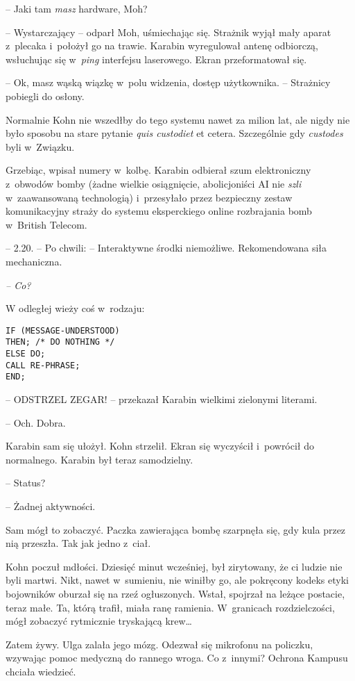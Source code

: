 \documentclass[oneside,polish,11pt,sfheadings]{mwbk}
\begin{document}
-- Jaki tam \emph{masz} hardware, Moh?

-- Wystarczający -- odparł Moh, uśmiechając się. Strażnik wyjął mały
aparat z~plecaka i~położył go na trawie. Karabin wyregulował antenę
odbiorczą, wsłuchując się w~\emph{ping} interfejsu laserowego. Ekran
przeformatował się.

-- Ok, masz wąską wiązkę w~polu widzenia, dostęp użytkownika. -- Strażnicy
pobiegli do osłony.

Normalnie Kohn nie wszedłby do tego systemu nawet za milion lat, ale
nigdy nie było sposobu na stare pytanie \emph{quis custodiet} et cetera.
Szczególnie gdy \emph{custodes }byli w~Związku.

Grzebiąc, wpisał numery w~kolbę. Karabin odbierał szum elektroniczny z~obwodów bomby (żadne wielkie osiągnięcie, abolicjoniści AI nie
\emph{szli} w~zaawansowaną technologią) i~przesyłało przez bezpieczny
zestaw komunikacyjny straży do systemu eksperckiego online rozbrajania
bomb w~British Telecom.

-- 2.20. -- Po chwili: -- Interaktywne środki niemożliwe. Rekomendowana
siła mechaniczna.

\emph{-- Co?}

W odległej wieży coś w~rodzaju:

\begin{verbatim}
IF (MESSAGE-UNDERSTOOD)
THEN; /* DO NOTHING */
ELSE DO;
CALL RE-PHRASE;
END;
\end{verbatim} 

-- ODSTRZEL ZEGAR! -- przekazał Karabin wielkimi zielonymi literami.

-- Och. Dobra.

Karabin sam się ułożył. Kohn strzelił. Ekran się wyczyścił i~powrócił do
normalnego. Karabin był teraz samodzielny.

-- Status?

-- Żadnej aktywności.

Sam mógł to zobaczyć. Paczka zawierająca bombę szarpnęła się, gdy kula
przez nią przeszła. Tak jak jedno z~ciał.

Kohn poczuł mdłości. Dziesięć minut wcześniej, był zirytowany, że ci
ludzie nie byli martwi. Nikt, nawet w~sumieniu, nie winiłby go, ale
pokręcony kodeks etyki bojowników oburzał się na rzeź ogłuszonych.
Wstał, spojrzał na leżące postacie, teraz małe. Ta, którą trafił, miała
ranę ramienia. W~granicach rozdzielczości, mógł zobaczyć rytmicznie
tryskającą krew\ldots

Zatem żywy. Ulga zalała jego mózg. Odezwał się mikrofonu na policzku,
wzywając pomoc medyczną do rannego wroga. Co z~innymi? Ochrona Kampusu
chciała wiedzieć.
\end{document}
